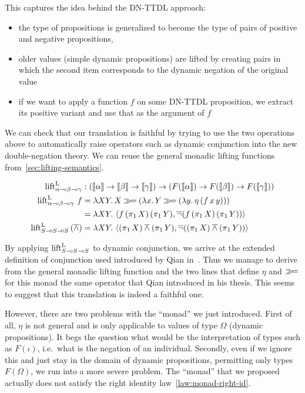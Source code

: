 This captures the idea behind the DN-TTDL approach:

\begin{itemize}
\item the type of propositions is generalized to become the type of pairs
  of positive and negative propositions,
\item older values (simple dynamic propositions) are lifted by creating
  pairs in which the second item corresponds to the dynamic negation of the
  original value
\item if we want to apply a function $f$ on some DN-TTDL proposition, we
  extract its positive variant and use that as the argument of $f$
\end{itemize}

We can check that our translation is faithful by trying to use the two
operations above to automatically raise operators such as dynamic
conjunction into the new double-negation theory. We can reuse the general
monadic lifting functions from~\ref{sec:lifting-semantics}.

\begin{align*}
  \operatorname{lift}^{\mathrm{L}}_{\alpha \mathbin{{-}\mkern-3.5mu{\circ}} \beta \mathbin{{-}\mkern-3.5mu{\circ}} \gamma} &: (\llbracket \alpha \rrbracket \to \llbracket \beta \rrbracket \to \llbracket \gamma \rrbracket) \to (F(\llbracket \alpha \rrbracket) \to F(\llbracket \beta \rrbracket) \to F(\llbracket \gamma \rrbracket)) \\
  \operatorname{lift}^{\mathrm{L}}_{\alpha \mathbin{{-}\mkern-3.5mu{\circ}} \beta \mathbin{{-}\mkern-3.5mu{\circ}} \gamma}\,f
     &= \lambda X Y.\, X \mathbin{\gg\!=} (\lambda x.\, Y \mathbin{\gg\!=} (\lambda y.\, \eta\,(f\,x\,y))) \\
     &= \lambda X Y.\, \left< f\,(\pi_1\,X)\,(\pi_1\,Y), \mathop{\overline{\lnot}} (f\,(\pi_1\,X)\,(\pi_1\,Y)) \right> \\
  \operatorname{lift}^{\mathrm{L}}_{S \mathbin{{-}\mkern-3.5mu{\circ}} S \mathbin{{-}\mkern-3.5mu{\circ}} S}\,(\mathbin{\overline{\land}})
     &= \lambda X Y.\, \left< (\pi_1\,X) \mathbin{\overline{\land}} (\pi_1\,Y), \mathop{\overline{\lnot}} ((\pi_1\,X) \mathbin{\overline{\land}} (\pi_1\,Y)) \right>
\end{align*}

By applying $\operatorname{lift}^{\mathrm{L}}_{S \mathbin{{-}\mkern-3.5mu{\circ}} S \mathbin{{-}\mkern-3.5mu{\circ}} S}$ to dynamic conjunction, we arrive
at the extended definition of conjunction used introduced by Qian
in~\cite{qian2014accessibility}. Thus we manage to derive from the general
monadic lifting function and the two lines that define $\eta$ and $\mathbin{\gg\!=}$
for this monad the same operator that Qian introduced in his thesis. This
seems to suggest that this translation is indeed a faithful one.

However, there are two problems with the ``monad'' we just
introduced. First of all, $\eta$ is not general and is only applicable to
values of type $\Omega$ (dynamic propositions). It begs the question what
would be the interpretation of types such as $F(\iota)$, i.e.\ what is the
negation of an individual. Secondly, even if we ignore this and just stay
in the domain of dynamic propositions, permitting only types $F(\Omega)$,
we run into a more severe problem. The ``monad'' that we proposed actually
does not satisfy the right identity law~\eqref{law:monad-right-id}.

